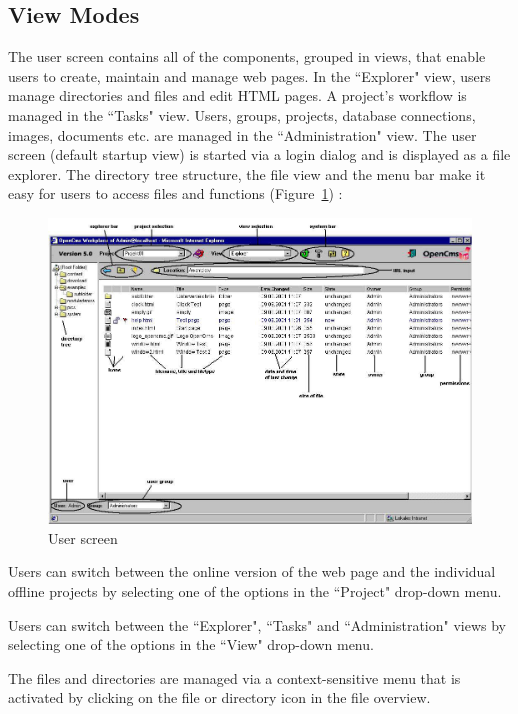 \subsection{View Modes}

The user screen contains all of the components, grouped in views,
that enable users to create, maintain and manage web pages. In the
``Explorer" view, users manage directories and files and edit HTML
pages. A project's workflow is managed in the ``Tasks" view. Users,
groups, projects, database connections, images, documents etc. are
managed in the ``Administration" view. The user screen (default
startup view) is started via a login dialog and is displayed as a
file explorer. The directory tree structure, the file view and the
menu bar make it easy for users to access files and functions
(Figure~\ref{workplace}) :

\begin{figure}[!hbt]
\begin{center}
\includegraphics[width=\sgw]
                   {pics/usermanual/workplace}
\caption[User screen]
           {User screen}
\label{workplace}
\end{center}
\end{figure}

Users can switch between the online version of the web page and
the individual offline projects by selecting one of the options in the
``Project" drop-down menu.

Users can switch between the ``Explorer", ``Tasks" and
``Administration" views by selecting one of the options in the
``View" drop-down menu.

The files and directories are managed via a context-sensitive menu
that is activated by clicking on the file or directory icon in the
file overview.


